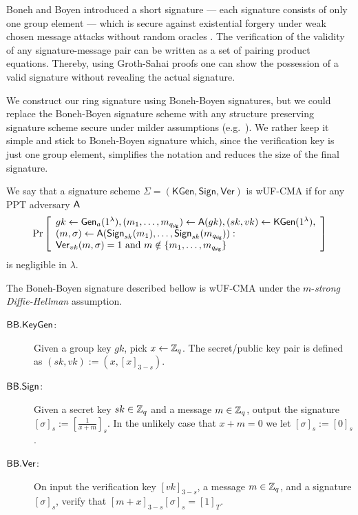 

Boneh and Boyen introduced a short signature --- each signature consists of only one group element --- which is secure against existential forgery under weak chosen message attacks without random oracles \cite{EC:BonBoy04a}.
The verification of the validity of any signature-message pair can be written as a set of pairing product equations. Thereby, using Groth-Sahai proofs one can show the possession of a valid signature without revealing the actual signature.

We construct our ring signature using Boneh-Boyen signatures, but we could replace the Boneh-Boyen signature scheme with any structure preserving signature scheme secure under milder assumptions (e.g.~\cite{EPRINT:JutRoy17}). We rather keep it simple and stick to Boneh-Boyen signature which, since the verification key is just one group element, simplifies the notation and reduces the size of the final signature.
 
\begin{definition} We say that a signature scheme $\Sigma = (\mathsf{KGen},\mathsf{Sign},\mathsf{Ver})$ is wUF-CMA if for any PPT adversary $\mathsf{A}$
	$$
	\Pr\left[\begin{array}{l}
	gk \gets \mathsf{Gen}_a(1^\lambda), (m_1,\ldots,m_{q_\mathsf{sig}})\gets\mathsf{A}(gk), (sk,vk)\gets\mathsf{KGen}(1^\lambda), \\
	(m,\sigma)\gets\mathsf{A}(\mathsf{Sign}_{sk}(m_1),\ldots,\mathsf{Sign}_{sk}(m_{q_\mathsf{sig}})):\\
	\mathsf{Ver}_{vk}(m,\sigma)=1 \text{ and } m\notin \{m_1,\ldots,m_{q_\mathsf{sig}}\}
	\end{array}\right]
	$$
is negligible in $\lambda$.
\end{definition}

The Boneh-Boyen signature described bellow is wUF-CMA under the $m$-\emph{strong Diffie-Hellman} assumption.
%
%

\begin{description}
\item[$\mathsf{BB}.\mathsf{KeyGen}$:] Given a group key $gk$, pick $x\gets\mathbb{Z}_q$. The secret/public key pair is defined as $(sk,vk):=(x,[x]_{3-s})$.
\item[$\mathsf{BB}.\mathsf{Sign}$:] Given a secret key $sk\in\mathbb{Z}_q$ and a message $m\in\mathbb{Z}_q$, output the signature $[\sigma]_{s}:=\left[\frac{1}{x+m}\right]_{s}$. In the unlikely case that $x+m=0$ we let $[\sigma]_{s}:=[0]_{s}$.
\item[$\mathsf{BB}.\mathsf{Ver}$:] On input the verification key $[vk]_{3-s}$, a message $m\in\mathbb{Z}_q$, and a signature $[\sigma]_{s}$, verify that $[m+x]_{3-s}[\sigma]_{s}=[1]_T$.
\end{description} 

